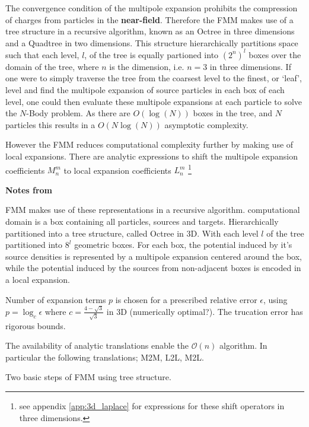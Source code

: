The convergence condition of the multipole expansion prohibits the compression
of charges from particles in the \textbf{\gls{near-field}}. Therefore the FMM
makes use of a tree structure in a recursive algorithm, known as an Octree in
three dimensions and a Quadtree in two dimensions. This structure hierarchically
partitions space such that each level, $l$, of the tree is equally partioned into
$(2^n)^l$ boxes over the domain of the tree, where $n$ is the dimension,
i.e. $n=3$ in three dimensions. If one were to simply traverse the tree from
the coarsest level to the finest, or `leaf', level and find the multipole expansion of source
particles in each box of each level, one could then evaluate these multipole expansions
at each particle to solve the $N$-Body problem. As there are $O(\log(N))$
boxes in the tree, and $N$ particles this results in a $O(N\log(N))$ asymptotic
complexity.

However the FMM reduces computational complexity further by making use of local
expansions. There are analytic expressions to shift the multipole expansion
coefficients $M_n^m$ to local expansion coefficients $L_n^m$ \footnote{see
appendix \ref{app:3d_laplace} for expressions for these shift operators in three
dimensions.}


\textbf{Notes from \cite{Ying:2004:JCP}}

FMM makes use of these representations in a recursive algorithm. computational
domain is a box containing all particles, sources and targets. Hierarchically
partitioned into a tree structure, called Octree in 3D. With each level $l$ of the
tree partitioned into $8^l$ geometric boxes. For each box, the potential induced
by it's source densities is represented by a multipole expansion centered around
the box, while the potential induced by the sources from non-adjacent boxes is
encoded in a local expansion.

Number of expansion terms $p$ is chosen for a prescribed relative error $\epsilon$,
using $p=\log_c \epsilon$ where $c=\frac{4-\sqrt{3}}{\sqrt{3}}$ in 3D (numerically optimal?).
The trucation error has rigorous bounds.

The availability of analytic translations enable the $\mathcal{O}(n)$ algorithm.
In particular the following translations; M2M, L2L, M2L.

Two basic steps of FMM using tree structure.

